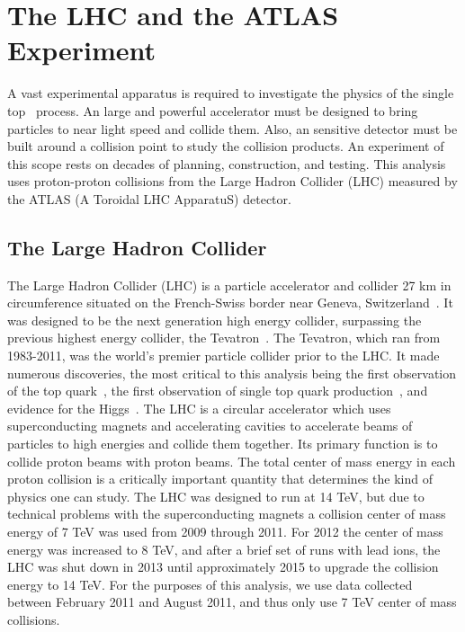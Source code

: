 \chapter{The LHC and the ATLAS Experiment}
\label{SECTION-ATLAS}
A vast experimental apparatus is required to investigate the physics of the single top \Wtchan\ process. An large and powerful accelerator must be designed to bring particles to near light speed and collide them. Also, an sensitive detector must be built around a collision point to study the collision products. An experiment of this scope rests on decades of planning, construction, and testing. This analysis uses proton-proton collisions from the Large Hadron Collider (LHC) measured by the ATLAS (A Toroidal LHC ApparatuS) detector.
\section{The Large Hadron Collider}
\label{SECTION-ATLAS-LHC}

The Large Hadron Collider (LHC) is a particle accelerator and collider 27 km in circumference situated on the French-Swiss border near Geneva, Switzerland~\cite{LHC}. It was designed to be the next generation high energy collider, surpassing the previous highest energy collider, the Tevatron~\cite{TEVATRON}. The Tevatron, which ran from 1983-2011, was the world's premier particle collider prior to the LHC. It made numerous discoveries, the most critical to this analysis being the first observation of the top quark~\cite{Top-CDF, Top-D0}, the first observation of single top quark production~\cite{SGTOP-D0, SGTOP-CDF}, and evidence for the Higgs~\cite{d0higgs}. The LHC is a circular accelerator which uses superconducting magnets and accelerating cavities to accelerate beams of particles to high energies and collide them together. Its primary function is to collide proton beams with proton beams. The total center of mass energy in each proton collision is a critically important quantity that determines the kind of physics one can study. The LHC was designed to run at 14 TeV, but due to technical problems with the superconducting magnets a collision center of mass energy of 7 TeV was used from 2009 through 2011. For 2012 the center of mass energy was increased to 8 TeV, and after a brief set of runs with lead ions, the LHC was shut down in 2013 until approximately 2015 to upgrade the collision energy to 14 TeV. For the purposes of this analysis, we use data collected between February 2011 and August 2011, and thus only use 7 TeV center of mass collisions.

